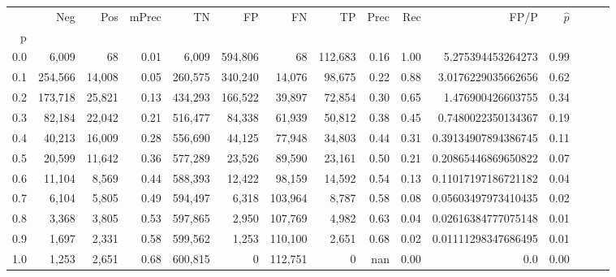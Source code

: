 \begin{tabular}{rrrrrrrrrrrrrrr}
\toprule
{} &      Neg &     Pos & mPrec &       TN &       FP &       FN &       TP &  Prec &   Rec &                 FP/P & $\hat{p}$ \\
p   &          &         &       &          &          &          &          &       &       &                      &           \\
\midrule
0.0 &    6,009 &      68 &  0.01 &    6,009 &  594,806 &       68 &  112,683 &  0.16 &  1.00 &    5.275394453264273 &      0.99 \\
0.1 &  254,566 &  14,008 &  0.05 &  260,575 &  340,240 &   14,076 &   98,675 &  0.22 &  0.88 &   3.0176229035662656 &      0.62 \\
0.2 &  173,718 &  25,821 &  0.13 &  434,293 &  166,522 &   39,897 &   72,854 &  0.30 &  0.65 &    1.476900426603755 &      0.34 \\
0.3 &   82,184 &  22,042 &  0.21 &  516,477 &   84,338 &   61,939 &   50,812 &  0.38 &  0.45 &   0.7480022350134367 &      0.19 \\
0.4 &   40,213 &  16,009 &  0.28 &  556,690 &   44,125 &   77,948 &   34,803 &  0.44 &  0.31 &  0.39134907894386745 &      0.11 \\
0.5 &   20,599 &  11,642 &  0.36 &  577,289 &   23,526 &   89,590 &   23,161 &  0.50 &  0.21 &  0.20865446869650822 &      0.07 \\
0.6 &   11,104 &   8,569 &  0.44 &  588,393 &   12,422 &   98,159 &   14,592 &  0.54 &  0.13 &  0.11017197186721182 &      0.04 \\
0.7 &    6,104 &   5,805 &  0.49 &  594,497 &    6,318 &  103,964 &    8,787 &  0.58 &  0.08 &  0.05603497973410435 &      0.02 \\
0.8 &    3,368 &   3,805 &  0.53 &  597,865 &    2,950 &  107,769 &    4,982 &  0.63 &  0.04 &  0.02616384777075148 &      0.01 \\
0.9 &    1,697 &   2,331 &  0.58 &  599,562 &    1,253 &  110,100 &    2,651 &  0.68 &  0.02 &  0.01111298347686495 &      0.01 \\
1.0 &    1,253 &   2,651 &  0.68 &  600,815 &        0 &  112,751 &        0 &   nan &  0.00 &                  0.0 &      0.00 \\
\bottomrule
\end{tabular}
